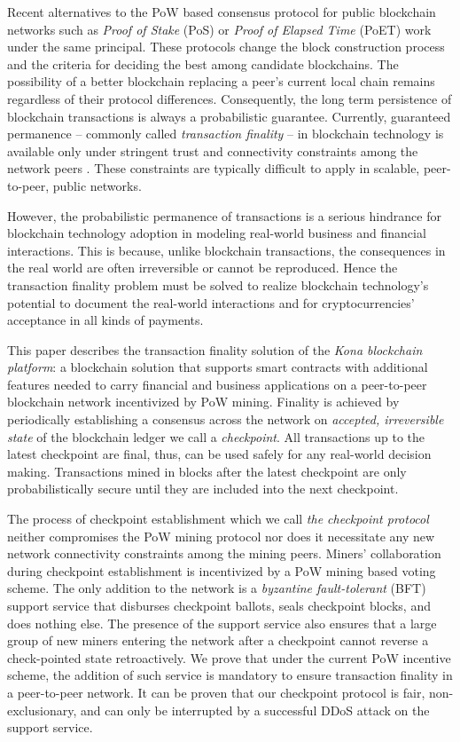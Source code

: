 Recent alternatives to the PoW based consensus protocol for public blockchain networks such as \textit{Proof of Stake} (PoS) \cite{casper} or \textit{Proof of Elapsed Time} (PoET) \cite{poet} work under the same principal. These protocols change the block construction process and the criteria for deciding the best among candidate blockchains. The possibility of a better blockchain replacing a peer's current local chain remains regardless of their protocol differences. Consequently, the long term persistence of blockchain transactions is always a probabilistic guarantee. Currently, guaranteed permanence -- commonly called \textit{transaction finality} -- in blockchain technology is available only under stringent trust and connectivity constraints among the network peers \cite{David2014TheRP, thestellar}. These constraints are typically difficult to apply in scalable, peer-to-peer, public networks.   

However, the probabilistic permanence of transactions is a serious hindrance for blockchain technology adoption in modeling real-world business and financial interactions. This is because, unlike blockchain transactions, the consequences in the real world are often irreversible or cannot be reproduced. Hence the transaction finality problem must be solved to realize blockchain technology's potential to document the real-world interactions and for cryptocurrencies' acceptance in all kinds of payments.

This paper describes the transaction finality solution of the \textit{Kona blockchain platform}: a blockchain solution that supports smart contracts with additional features needed to carry financial and business applications on a peer-to-peer blockchain network incentivized by PoW mining. Finality is achieved by periodically establishing a consensus across the network on \textit{accepted, irreversible state} of the blockchain ledger we call a \textit{checkpoint}. All transactions up to the latest checkpoint are final, thus, can be used safely for any real-world decision making. Transactions mined in blocks after the latest checkpoint are only probabilistically secure until they are included into the next checkpoint. 

The process of checkpoint establishment which we call \textit{the checkpoint protocol} neither compromises the PoW mining protocol nor does it necessitate any new network connectivity constraints among the mining peers. Miners' collaboration during checkpoint establishment is incentivized by a PoW mining based voting scheme. The only addition to the network is a \textit{byzantine fault-tolerant} (BFT) \cite{Lamport:1982:BGP:357172.357176} support service that disburses checkpoint ballots, seals checkpoint blocks, and does nothing else. The presence of the support service also ensures that a large group of new miners entering the network after a checkpoint cannot reverse a check-pointed state retroactively. We prove that under the current PoW incentive scheme, the addition of such service is mandatory to ensure transaction finality in a peer-to-peer network. It can be proven that our checkpoint protocol is fair, non-exclusionary, and can only be interrupted by a successful DDoS attack \cite{Yu:2013:DDS:2556385} on the support service.          


